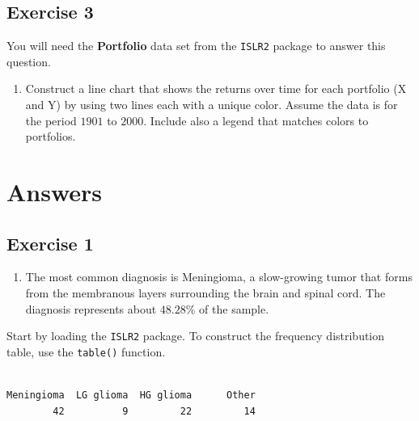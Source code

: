 \documentclass[
  letterpaper,
  DIV=11,
  numbers=noendperiod]{scrreprt}
\newenvironment{Shaded}{\begin{snugshade}}{\end{snugshade}}
\newcommand{\FunctionTok}[1]{\textcolor[rgb]{0.28,0.35,0.67}{#1}}
\newcommand{\NormalTok}[1]{\textcolor[rgb]{0.00,0.23,0.31}{#1}}
\newcommand{\SpecialCharTok}[1]{\textcolor[rgb]{0.37,0.37,0.37}{#1}}
\providecommand{\tightlist}{%
  \setlength{\itemsep}{0pt}\setlength{\parskip}{0pt}}\usepackage{longtable,booktabs,array}
\begin{document}
\hypertarget{exercise-3-2}{%
\subsection*{Exercise 3}\label{exercise-3-2}}

You will need the \textbf{Portfolio} data set from the \texttt{ISLR2}
package to answer this question.

\begin{enumerate}
\def\labelenumi{\arabic{enumi}.}
\tightlist
\item
  Construct a line chart that shows the returns over time for each
  portfolio (X and Y) by using two lines each with a unique color.
  Assume the data is for the period \(1901\) to \(2000\). Include also a
  legend that matches colors to portfolios.
\end{enumerate}

\hypertarget{answers-1}{%
\section{Answers}\label{answers-1}}

\hypertarget{exercise-1-3}{%
\subsection*{Exercise 1}\label{exercise-1-3}}

\begin{enumerate}
\def\labelenumi{\arabic{enumi}.}
\tightlist
\item
  The most common diagnosis is Meningioma, a slow-growing tumor that
  forms from the membranous layers surrounding the brain and spinal
  cord. The diagnosis represents about \(48.28\)\% of the sample.
\end{enumerate}

Start by loading the \texttt{ISLR2} package. To construct the frequency
distribution table, use the \texttt{table()} function.

\begin{Shaded}
\end{Shaded}

\begin{verbatim}

Meningioma  LG glioma  HG glioma      Other 
        42          9         22         14 
\end{verbatim}
\end{document}
